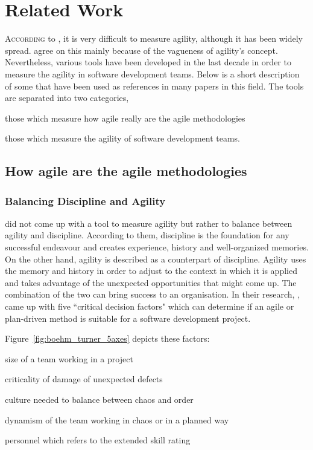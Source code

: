 \chapter{Related Work}\label{ch:related_work}

\lettrine[lines=4, loversize=-0.1, lraise=0.1]{A}{ccording} to \citet{yauch}, it is very difficult to measure agility, although it has been widely spread. \citet{tsourveloudis} agree on this mainly because of the vagueness of agility's concept. Nevertheless, various tools have been developed in the last decade in order to measure the agility in software development teams. Below is a short description of some that have been used as references in many papers in this field. The tools are separated into two categories, 
\begin{inparaenum} [a\upshape)]
\item those which measure how agile really are the agile methodologies
\item those which measure the agility of software development teams.
\end{inparaenum}


\section{How agile are the agile methodologies}

\subsection{Balancing Discipline and Agility}
\citet{1231450} did not come up with a tool to measure agility but rather to balance between agility and discipline. According to them, discipline is the foundation for any successful endeavour and creates experience, history and well-organized memories. On the other hand, agility is described as a counterpart of discipline. Agility uses the memory and history in order to adjust to the context in which it is applied and takes advantage of the unexpected opportunities that might come up. The combination of the two can bring success to an organisation. In their research, \citet{1231450}, came up with five ``critical decision factors" which can determine if an agile or plan-driven method is suitable for a software development project.

Figure~\ref{fig:boehm_turner_5axes} depicts these factors:
\begin{inparaenum} [a\upshape)]
\item size of a team working in a project
\item criticality of damage of unexpected defects
\item culture needed to balance between chaos and order
\item dynamism of the team working in chaos or in a planned way
\item personnel which refers to the extended \citet{cockburn2002agile} skill rating %
\end{inparaenum}

